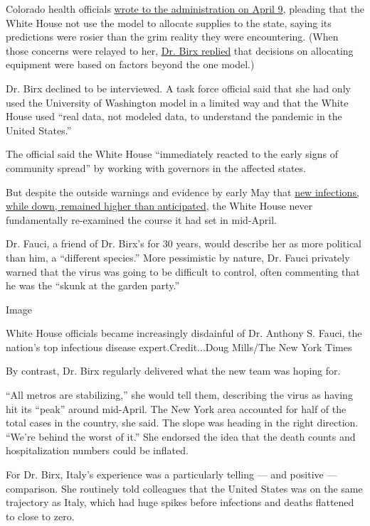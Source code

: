 Colorado health officials
\href{https://documentingcovid19.io/uploads/DHS\%20HHS\%20ventilator\%20usage\%20by\%20state\%20April\%2012.pdf}{wrote
to the administration on April 9}, pleading that the White House not use
the model to allocate supplies to the state, saying its predictions were
rosier than the grim reality they were encountering. (When those
concerns were relayed to her,
\href{https://www.documentcloud.org/documents/6994649-2020-04-13-Colorado-Re-Birx-IHME-Colorado-FOIA.html}{Dr.
Birx replied} that decisions on allocating equipment were based on
factors beyond the one model.)

Dr. Birx declined to be interviewed. A task force official said that she
had only used the University of Washington model in a limited way and
that the White House used ``real data, not modeled data, to understand
the pandemic in the United States.''

The official said the White House ``immediately reacted to the early
signs of community spread'' by working with governors in the affected
states.

But despite the outside warnings and evidence by early May that
\href{https://www.nytimes3xbfgragh.onion/interactive/2020/us/coronavirus-us-cases.html}{new
infections, while down, remained higher than anticipated}, the White
House never fundamentally re-examined the course it had set in
mid-April.

Dr. Fauci, a friend of Dr. Birx's for 30 years, would describe her as
more political than him, a ``different species.'' More pessimistic by
nature, Dr. Fauci privately warned that the virus was going to be
difficult to control, often commenting that he was the ``skunk at the
garden party.''

Image

White House officials became increasingly disdainful of Dr. Anthony S.
Fauci, the nation's top infectious disease expert.Credit...Doug
Mills/The New York Times

By contrast, Dr. Birx regularly delivered what the new team was hoping
for.

``All metros are stabilizing,'' she would tell them, describing the
virus as having hit its ``peak'' around mid-April. The New York area
accounted for half of the total cases in the country, she said. The
slope was heading in the right direction. ``We're behind the worst of
it.'' She endorsed the idea that the death counts and hospitalization
numbers could be inflated.

For Dr. Birx, Italy's experience was a particularly telling --- and
positive --- comparison. She routinely told colleagues that the United
States was on the same trajectory as Italy, which had huge spikes before
infections and deaths flattened to close to zero.

